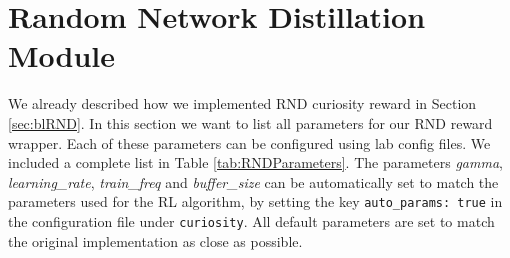\section{Random Network Distillation Module}
We already described how we implemented RND curiosity reward in Section \ref{sec:blRND}. In this section we want to list all parameters for our RND reward wrapper. Each of these parameters can be configured using lab config files. We included a complete list in Table \ref{tab:RNDParameters}. The parameters \textit{gamma}, \textit{learning\_rate}, \textit{train\_freq} and \textit{buffer\_size} can be automatically set to match the parameters used for the RL algorithm, by setting the key \texttt{auto\_params: true} in the configuration file under \texttt{curiosity}. All default parameters are set to match the original implementation as close as possible.

